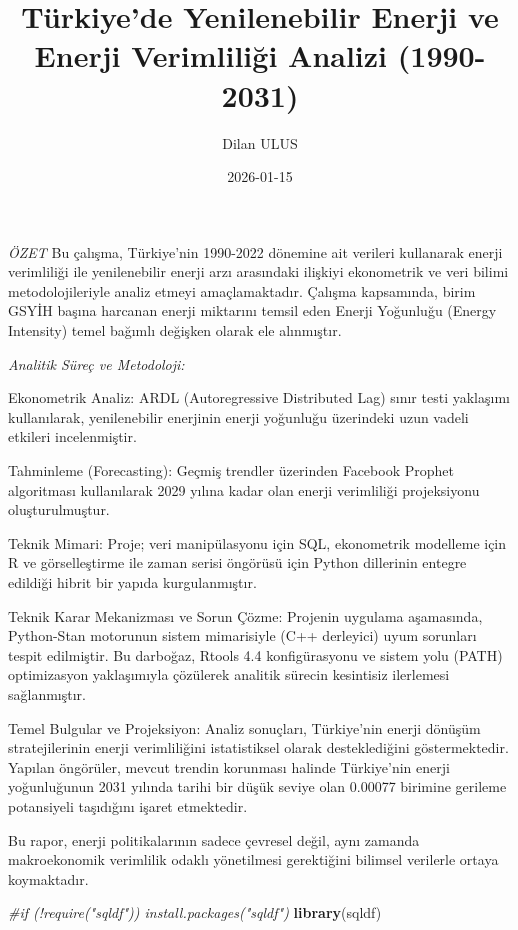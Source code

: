 \documentclass[
]{article}
\title{Türkiye'de Yenilenebilir Enerji ve Enerji Verimliliği Analizi
(1990-2031)}
\author{Dilan ULUS}
\date{2026-01-15}
\newenvironment{Shaded}{\begin{snugshade}}{\end{snugshade}}
\newcommand{\CommentTok}[1]{\textcolor[rgb]{0.56,0.35,0.01}{\textit{#1}}}
\newcommand{\FunctionTok}[1]{\textcolor[rgb]{0.13,0.29,0.53}{\textbf{#1}}}
\newcommand{\NormalTok}[1]{#1}
\begin{document}
\maketitle

\emph{ÖZET} Bu çalışma, Türkiye'nin 1990-2022 dönemine ait verileri
kullanarak enerji verimliliği ile yenilenebilir enerji arzı arasındaki
ilişkiyi ekonometrik ve veri bilimi metodolojileriyle analiz etmeyi
amaçlamaktadır. Çalışma kapsamında, birim GSYİH başına harcanan enerji
miktarını temsil eden Enerji Yoğunluğu (Energy Intensity) temel bağımlı
değişken olarak ele alınmıştır.

\emph{Analitik Süreç ve Metodoloji:}

Ekonometrik Analiz: ARDL (Autoregressive Distributed Lag) sınır testi
yaklaşımı kullanılarak, yenilenebilir enerjinin enerji yoğunluğu
üzerindeki uzun vadeli etkileri incelenmiştir.

Tahminleme (Forecasting): Geçmiş trendler üzerinden Facebook Prophet
algoritması kullanılarak 2029 yılına kadar olan enerji verimliliği
projeksiyonu oluşturulmuştur.

Teknik Mimari: Proje; veri manipülasyonu için SQL, ekonometrik modelleme
için R ve görselleştirme ile zaman serisi öngörüsü için Python
dillerinin entegre edildiği hibrit bir yapıda kurgulanmıştır.

Teknik Karar Mekanizması ve Sorun Çözme: Projenin uygulama aşamasında,
Python-Stan motorunun sistem mimarisiyle (C++ derleyici) uyum sorunları
tespit edilmiştir. Bu darboğaz, Rtools 4.4 konfigürasyonu ve sistem yolu
(PATH) optimizasyon yaklaşımıyla çözülerek analitik sürecin kesintisiz
ilerlemesi sağlanmıştır.

Temel Bulgular ve Projeksiyon: Analiz sonuçları, Türkiye'nin enerji
dönüşüm stratejilerinin enerji verimliliğini istatistiksel olarak
desteklediğini göstermektedir. Yapılan öngörüler, mevcut trendin
korunması halinde Türkiye'nin enerji yoğunluğunun 2031 yılında tarihi
bir düşük seviye olan 0.00077 birimine gerileme potansiyeli taşıdığını
işaret etmektedir.

Bu rapor, enerji politikalarının sadece çevresel değil, aynı zamanda
makroekonomik verimlilik odaklı yönetilmesi gerektiğini bilimsel
verilerle ortaya koymaktadır.

\begin{Shaded}
\begin{Highlighting}[]
\CommentTok{\#if (!require("sqldf")) install.packages("sqldf")}
\FunctionTok{library}\NormalTok{(sqldf)}
\end{Highlighting}
\end{Shaded}
\end{document}
